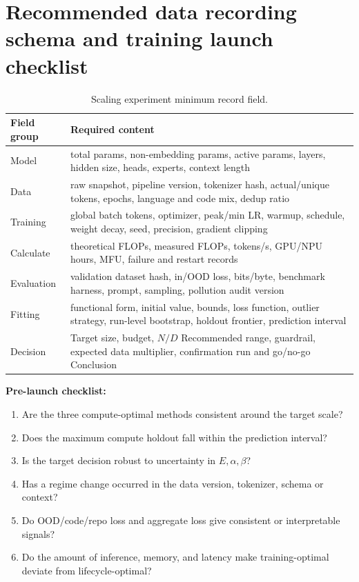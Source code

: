 \documentclass[UTF8,10pt,a4paper,fontset=none]{ctexart}
\begin{document}
\clearpage
\section{Recommended data recording schema and training launch checklist}
\label{app:schema}

\begin{table}[htbp]
\centering
\caption{Scaling experiment minimum record field. }\label{tab:schema}
\begin{tabularx}{\textwidth}{p{4.0cm}X}
\toprule
Field group & Required content \\
\midrule
Model & total params, non-embedding params, active params, layers, hidden size, heads, experts, context length \\
Data & raw snapshot, pipeline version, tokenizer hash, actual/unique tokens, epochs, language and code mix, dedup ratio \\
Training & global batch tokens, optimizer, peak/min LR, warmup, schedule, weight decay, seed, precision, gradient clipping \\
Calculate & theoretical FLOPs, measured FLOPs, tokens/s, GPU/NPU hours, MFU, failure and restart records \\
Evaluation & validation dataset hash, in/OOD loss, bits/byte, benchmark harness, prompt, sampling, pollution audit version \\
Fitting & functional form, initial value, bounds, loss function, outlier strategy, run-level bootstrap, holdout frontier, prediction interval \\
Decision & Target size, budget, $N/D$ Recommended range, guardrail, expected data multiplier, confirmation run and go/no-go Conclusion \\
\bottomrule
\end{tabularx}
\end{table}

\noindent\textbf{Pre-launch checklist:}
\begin{enumerate}
\item Are the three compute-optimal methods consistent around the target scale?
\item Does the maximum compute holdout fall within the prediction interval?
\item Is the target decision robust to uncertainty in $E,\alpha,\beta$?
\item Has a regime change occurred in the data version, tokenizer, schema or context?
\item Do OOD/code/repo loss and aggregate loss give consistent or interpretable signals?
\item Do the amount of inference, memory, and latency make training-optimal deviate from lifecycle-optimal?
\end{enumerate}
\end{document}
